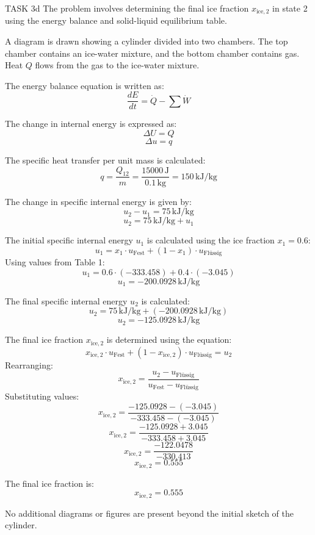 TASK 3d  
The problem involves determining the final ice fraction \( x_{\text{ice},2} \) in state 2 using the energy balance and solid-liquid equilibrium table.  

A diagram is drawn showing a cylinder divided into two chambers. The top chamber contains an ice-water mixture, and the bottom chamber contains gas. Heat \( Q \) flows from the gas to the ice-water mixture.  

The energy balance equation is written as:  
\[
\frac{dE}{dt} = \dot{Q} - \sum \dot{W}
\]  

The change in internal energy is expressed as:  
\[
\Delta U = Q
\]  
\[
\Delta u = q
\]  

The specific heat transfer per unit mass is calculated:  
\[
q = \frac{Q_{12}}{m} = \frac{15000 \, \text{J}}{0.1 \, \text{kg}} = 150 \, \text{kJ/kg}
\]  

The change in specific internal energy is given by:  
\[
u_2 - u_1 = 75 \, \text{kJ/kg}
\]  
\[
u_2 = 75 \, \text{kJ/kg} + u_1
\]  

The initial specific internal energy \( u_1 \) is calculated using the ice fraction \( x_1 = 0.6 \):  
\[
u_1 = x_1 \cdot u_{\text{Fest}} + (1 - x_1) \cdot u_{\text{Flüssig}}
\]  
Using values from Table 1:  
\[
u_1 = 0.6 \cdot (-333.458) + 0.4 \cdot (-3.045)
\]  
\[
u_1 = -200.0928 \, \text{kJ/kg}
\]  

The final specific internal energy \( u_2 \) is calculated:  
\[
u_2 = 75 \, \text{kJ/kg} + (-200.0928 \, \text{kJ/kg})
\]  
\[
u_2 = -125.0928 \, \text{kJ/kg}
\]  

The final ice fraction \( x_{\text{ice},2} \) is determined using the equation:  
\[
x_{\text{ice},2} \cdot u_{\text{Fest}} + (1 - x_{\text{ice},2}) \cdot u_{\text{Flüssig}} = u_2
\]  
Rearranging:  
\[
x_{\text{ice},2} = \frac{u_2 - u_{\text{Flüssig}}}{u_{\text{Fest}} - u_{\text{Flüssig}}}
\]  
Substituting values:  
\[
x_{\text{ice},2} = \frac{-125.0928 - (-3.045)}{-333.458 - (-3.045)}
\]  
\[
x_{\text{ice},2} = \frac{-125.0928 + 3.045}{-333.458 + 3.045}
\]  
\[
x_{\text{ice},2} = \frac{-122.0478}{-330.413}
\]  
\[
x_{\text{ice},2} = 0.555
\]  

The final ice fraction is:  
\[
x_{\text{ice},2} = 0.555
\]  

No additional diagrams or figures are present beyond the initial sketch of the cylinder.